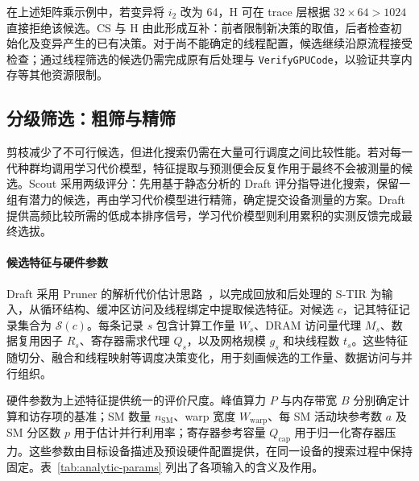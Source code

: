 \documentclass[11pt,twocolumn]{ctexart}
\begin{document}
在上述矩阵乘示例中，若变异将 $i_2$ 改为 64，H 可在 trace 层根据 $32\times64>1024$ 直接拒绝该候选。CS 与 H 由此形成互补：前者限制新决策的取值，后者检查初始化及变异产生的已有决策。对于尚不能确定的线程配置，候选继续沿原流程接受检查；通过线程筛选的候选仍需完成原有后处理与 \texttt{VerifyGPUCode}，以验证共享内存等其他资源限制。

\subsection{分级筛选：粗筛与精筛}
剪枝减少了不可行候选，但进化搜索仍需在大量可行调度之间比较性能。若对每一代种群均调用学习代价模型，特征提取与预测便会反复作用于最终不会被测量的候选。Scout 采用两级评分：先用基于静态分析的 Draft 评分指导进化搜索，保留一组有潜力的候选，再由学习代价模型进行精筛，确定提交设备测量的方案。Draft 提供高频比较所需的低成本排序信号，学习代价模型则利用累积的实测反馈完成最终选拔。

\paragraph{候选特征与硬件参数}
Draft 采用 Pruner 的解析代价估计思路~\cite{pruner}，以完成回放和后处理的 S-TIR 为输入，从循环结构、缓冲区访问及线程绑定中提取候选特征。对候选 $c$，记其特征记录集合为 $\mathcal S(c)$。每条记录 $s$ 包含计算工作量 $W_s$、DRAM 访问量代理 $M_s$、数据复用因子 $R_s$、寄存器需求代理 $Q_s$，以及网格规模 $g_s$ 和块线程数 $t_s$。这些特征随切分、融合和线程映射等调度决策变化，用于刻画候选的工作量、数据访问与并行组织。

硬件参数为上述特征提供统一的评价尺度。峰值算力 $P$ 与内存带宽 $B$ 分别确定计算和访存项的基准；SM 数量 $n_{\mathrm{SM}}$、warp 宽度 $W_{\mathrm{warp}}$、每 SM 活动块参考数 $a$ 及 SM 分区数 $p$ 用于估计并行利用率；寄存器参考容量 $Q_{\mathrm{cap}}$ 用于归一化寄存器压力。这些参数由目标设备描述及预设硬件配置提供，在同一设备的搜索过程中保持固定。表~\ref{tab:analytic-params} 列出了各项输入的含义及作用。
\end{document}
